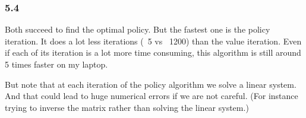 \documentclass[a4paper]{article}
\begin{document}
\subsubsection*{5.4}
Both succeed to find the optimal policy. But the fastest one is the policy iteration. It does a lot less iterations (~5 vs ~1200) than the value iteration.
Even if each of its iteration is a lot more time consuming, this algorithm is still around 5 times faster on my laptop.

But note that at each iteration of the policy algorithm we solve a linear system. And that could lead to huge numerical errors if we are not careful.
(For instance trying to inverse the matrix rather than solving the linear system.)
\end{document}
